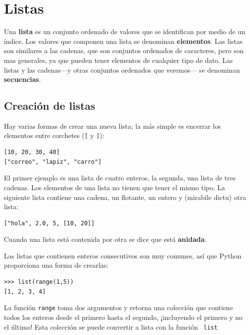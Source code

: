 
\chapter{Listas}

\label{cap:listas}   

Una \textbf{lista} es un conjunto ordenado de valores que se identifican
por medio de un índice. Los valores que componen una lista se denominan
\textbf{elementos}. Las listas son similares a las cadenas, que son
conjuntos ordenados de caracteres, pero son mas generales, ya que
pueden tener elementos de cualquier tipo de dato. Las listas y las
cadenas—y otras conjuntos ordenados que veremos— se denominan \textbf{secuencias}.

\section{Creación de listas}

Hay varias formas de crear una nueva lista; la más simple es encerrar
los elementos entre corchetes (\verb+[+ y \verb+]+):
\begin{lstlisting}
[10, 20, 30, 40]
["correo", "lapiz", "carro"]
\end{lstlisting}
El primer ejemplo es una lista de cuatro enteros, la segunda, una
lista de tres cadenas. Los elementos de una lista no tienen que tener
el mismo tipo. La siguiente lista contiene una cadena, un flotante,
un entero y (mirabile dictu) otra lista:
\begin{lstlisting}
["hola", 2.0, 5, [10, 20]]
\end{lstlisting}
Cuando una lista está contenida por otra se dice que está \textbf{anidada}.


Las listas que contienen enteros consecutivos son muy comunes, así
que Python proporciona una forma de crearlas:
\begin{lstlisting}
>>> list(range(1,5))
[1, 2, 3, 4]
\end{lstlisting}
La función \texttt{range} toma dos argumentos y retorna una colección
que contiene todos los enteros desde el primero hasta el segundo,
¡incluyendo el primero y no el último! Esta colección se puede convertir
a lista con la función  \texttt{ list }

